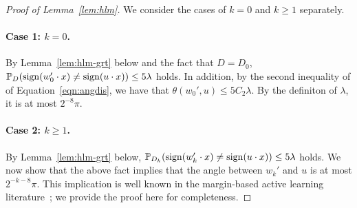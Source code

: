 \begin{proof}[Proof of Lemma~\ref{lem:hlm}]
We consider the cases of $k = 0$ and $k \geq 1$ separately.
\paragraph{Case 1: $k = 0$.} By Lemma~\ref{lem:hlm-grt} below and the fact that $D = D_0$, $\mathbb{P}_D(\operatorname{sign}(w_0' \cdot x) \neq \operatorname{sign}(u \cdot x)) \leq 5\lambda$ holds.
In addition, by the second inequality of of Equation~\eqref{eqn:angdis},
we have that $\theta(w_0',u) \leq 5 C_2 \lambda$.
By the definiton of $\lambda$, it is at most $2^{-8} \pi$.

\paragraph{Case 2: $k \geq 1$.} By Lemma~\ref{lem:hlm-grt} below, $\mathbb{P}_{D_k}(\operatorname{sign}(w_k' \cdot x) \neq \operatorname{sign}(u \cdot x)) \leq 5\lambda$ holds. We now show that the above fact implies that the angle between $w_k'$ and $u$ is
at most $2^{-k-8}\pi$. This implication is well known in the margin-based
active learning literature~\citep{BBZ07, BL13}; we provide the proof here for completeness.







\end{proof}
